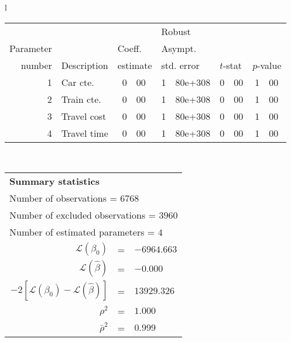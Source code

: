   \begin{tabular}{l}
\begin{tabular}{rlr@{.}lr@{.}lr@{.}lr@{.}l}
         &                       &   \multicolumn{2}{l}{}    & \multicolumn{2}{l}{Robust}  &     \multicolumn{4}{l}{}   \\
Parameter &                       &   \multicolumn{2}{l}{Coeff.}      & \multicolumn{2}{l}{Asympt.}  &     \multicolumn{4}{l}{}   \\
number &  Description                     &   \multicolumn{2}{l}{estimate}      & \multicolumn{2}{l}{std. error}  &   \multicolumn{2}{l}{$t$-stat}  &   \multicolumn{2}{l}{$p$-value}   \\

\hline

1 & Car cte. & 0&00 & 1&80e+308 & 0&00 & 1&00\\
2 & Train cte. & 0&00 & 1&80e+308 & 0&00 & 1&00\\
3 & Travel cost & 0&00 & 1&80e+308 & 0&00 & 1&00\\
4 & Travel time & 0&00 & 1&80e+308 & 0&00 & 1&00\\
\hline
\end{tabular}
\\
\begin{tabular}{rcl}
\multicolumn{3}{l}{\bf Summary statistics}\\
\multicolumn{3}{l}{ Number of observations = $6768$} \\
\multicolumn{3}{l}{ Number of excluded observations = $3960$} \\
\multicolumn{3}{l}{ Number of estimated  parameters = $4$} \\
 $\mathcal{L}(\beta_0)$ &=&  $-6964.663$ \\
 $\mathcal{L}(\hat{\beta})$ &=& $-0.000 $  \\
 $-2[\mathcal{L}(\beta_0) -\mathcal{L}(\hat{\beta})]$ &=& $13929.326$ \\
    $\rho^2$ &=&   $1.000$ \\
    $\bar{\rho}^2$ &=&    $0.999$ \\
\end{tabular}
  \end{tabular}
